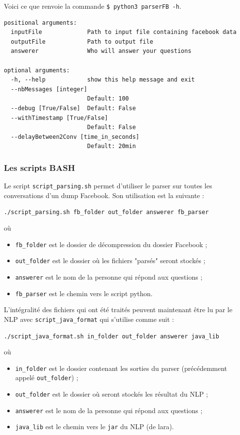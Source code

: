 \documentclass[10pt,a4paper]{article}
\begin{document}
Voici ce que renvoie la commande \texttt{\$ python3 parserFB -h}.

\begin{verbatim}
positional arguments:
  inputFile             Path to input file containing facebook data
  outputFile            Path to output file
  answerer              Who will answer your questions

optional arguments:
  -h, --help            show this help message and exit
  --nbMessages [integer]
                        Default: 100
  --debug [True/False]  Default: False
  --withTimestamp [True/False]
                        Default: False
  --delayBetween2Conv [time_in_seconds]
                        Default: 20min

\end{verbatim}
\subsubsection{Les scripts BASH}
Le script \texttt{script\_parsing.sh} permet d'utiliser le parser sur toutes les conversations d'un dump Facebook. Son utilisation est la suivante :
\begin{center}
\texttt{./script\_parsing.sh fb\_folder out\_folder answerer fb\_parser}
\end{center}
où
\begin{itemize}
\item \texttt{fb\_folder} est le dossier de décompression du dossier Facebook ;
\item \texttt{out\_folder} est le dossier où les fichiers "parsés" seront stockés ;
\item \texttt{answerer} est le nom de la personne qui répond aux questions ;
\item \texttt{fb\_parser} est le chemin vers le script python.
\end{itemize}
L'intégralité des fichiers qui ont été traités peuvent maintenant être lu par le NLP avec \texttt{script\_java\_format} qui s'utilise comme suit :
\begin{center}
\texttt{./script\_java\_format.sh in\_folder out\_folder answerer java\_lib}
\end{center}
où
\begin{itemize}
\item \texttt{in\_folder} est le dossier contenant les sorties du parser (précédemment appelé \texttt{out\_folder}) ;

\item \texttt{out\_folder} est le dossier où seront stockés les résultat du NLP ; 
\item \texttt{answerer} est le nom de la personne qui répond aux questions ;
\item \texttt{java\_lib} est le chemin vers le \texttt{jar} du NLP (de lara).
\end{itemize}
\end{document}
